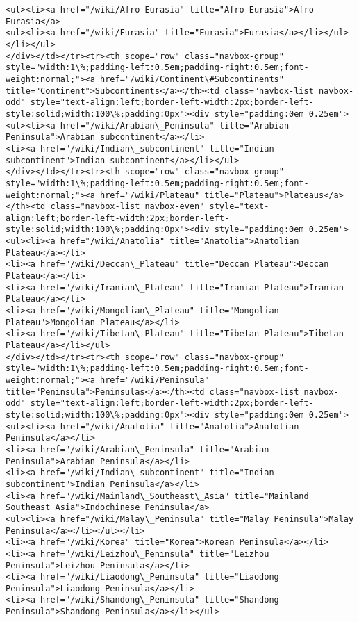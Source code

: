 \documentclass[11pt]{article}
\begin{document}
\begin{Verbatim}[commandchars=\\\{\}]
<ul><li><a href="/wiki/Afro-Eurasia" title="Afro-Eurasia">Afro-Eurasia</a>
<ul><li><a href="/wiki/Eurasia" title="Eurasia">Eurasia</a></li></ul></li></ul>
</div></td></tr><tr><th scope="row" class="navbox-group" style="width:1\%;padding-left:0.5em;padding-right:0.5em;font-weight:normal;"><a href="/wiki/Continent\#Subcontinents" title="Continent">Subcontinents</a></th><td class="navbox-list navbox-odd" style="text-align:left;border-left-width:2px;border-left-style:solid;width:100\%;padding:0px"><div style="padding:0em 0.25em">
<ul><li><a href="/wiki/Arabian\_Peninsula" title="Arabian Peninsula">Arabian subcontinent</a></li>
<li><a href="/wiki/Indian\_subcontinent" title="Indian subcontinent">Indian subcontinent</a></li></ul>
</div></td></tr><tr><th scope="row" class="navbox-group" style="width:1\%;padding-left:0.5em;padding-right:0.5em;font-weight:normal;"><a href="/wiki/Plateau" title="Plateau">Plateaus</a></th><td class="navbox-list navbox-even" style="text-align:left;border-left-width:2px;border-left-style:solid;width:100\%;padding:0px"><div style="padding:0em 0.25em">
<ul><li><a href="/wiki/Anatolia" title="Anatolia">Anatolian Plateau</a></li>
<li><a href="/wiki/Deccan\_Plateau" title="Deccan Plateau">Deccan Plateau</a></li>
<li><a href="/wiki/Iranian\_Plateau" title="Iranian Plateau">Iranian Plateau</a></li>
<li><a href="/wiki/Mongolian\_Plateau" title="Mongolian Plateau">Mongolian Plateau</a></li>
<li><a href="/wiki/Tibetan\_Plateau" title="Tibetan Plateau">Tibetan Plateau</a></li></ul>
</div></td></tr><tr><th scope="row" class="navbox-group" style="width:1\%;padding-left:0.5em;padding-right:0.5em;font-weight:normal;"><a href="/wiki/Peninsula" title="Peninsula">Peninsulas</a></th><td class="navbox-list navbox-odd" style="text-align:left;border-left-width:2px;border-left-style:solid;width:100\%;padding:0px"><div style="padding:0em 0.25em">
<ul><li><a href="/wiki/Anatolia" title="Anatolia">Anatolian Peninsula</a></li>
<li><a href="/wiki/Arabian\_Peninsula" title="Arabian Peninsula">Arabian Peninsula</a></li>
<li><a href="/wiki/Indian\_subcontinent" title="Indian subcontinent">Indian Peninsula</a></li>
<li><a href="/wiki/Mainland\_Southeast\_Asia" title="Mainland Southeast Asia">Indochinese Peninsula</a>
<ul><li><a href="/wiki/Malay\_Peninsula" title="Malay Peninsula">Malay Peninsula</a></li></ul></li>
<li><a href="/wiki/Korea" title="Korea">Korean Peninsula</a></li>
<li><a href="/wiki/Leizhou\_Peninsula" title="Leizhou Peninsula">Leizhou Peninsula</a></li>
<li><a href="/wiki/Liaodong\_Peninsula" title="Liaodong Peninsula">Liaodong Peninsula</a></li>
<li><a href="/wiki/Shandong\_Peninsula" title="Shandong Peninsula">Shandong Peninsula</a></li></ul>

\end{Verbatim}
\end{document}
